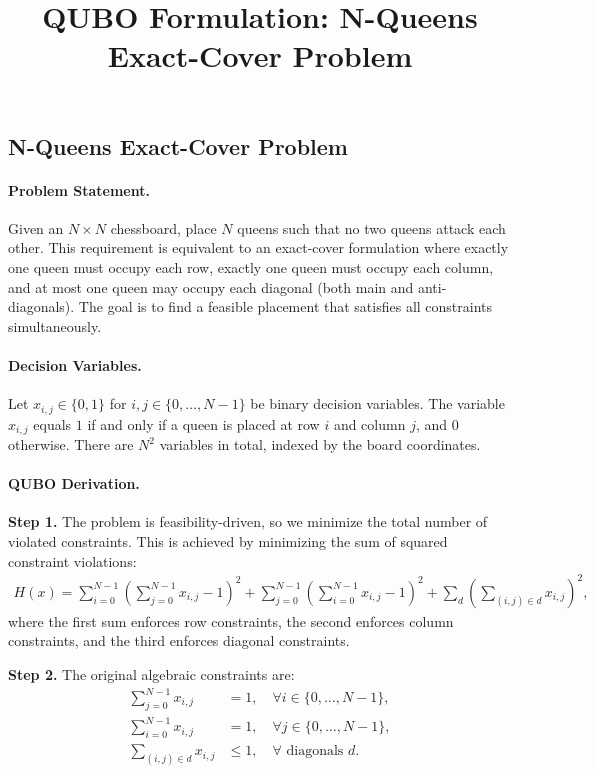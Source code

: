 \documentclass[12pt]{article}
\title{QUBO Formulation: N-Queens Exact-Cover Problem}
\date{}
\begin{document}
\maketitle

\subsection*{N-Queens Exact-Cover Problem}

\paragraph{Problem Statement.}
Given an $N \times N$ chessboard, place $N$ queens such that no two queens attack each other. This requirement is equivalent to an exact-cover formulation where exactly one queen must occupy each row, exactly one queen must occupy each column, and at most one queen may occupy each diagonal (both main and anti-diagonals). The goal is to find a feasible placement that satisfies all constraints simultaneously.

\paragraph{Decision Variables.}
Let $x_{i,j} \in \{0,1\}$ for $i,j \in \{0,\dots,N-1\}$ be binary decision variables. The variable $x_{i,j}$ equals $1$ if and only if a queen is placed at row $i$ and column $j$, and $0$ otherwise. There are $N^2$ variables in total, indexed by the board coordinates.

\paragraph{QUBO Derivation.}
\textbf{Step 1.} The problem is feasibility-driven, so we minimize the total number of violated constraints. This is achieved by minimizing the sum of squared constraint violations:
\begin{align}
H(x) = \sum_{i=0}^{N-1} \left(\sum_{j=0}^{N-1} x_{i,j} - 1\right)^2 + \sum_{j=0}^{N-1} \left(\sum_{i=0}^{N-1} x_{i,j} - 1\right)^2 + \sum_{d} \left(\sum_{(i,j) \in d} x_{i,j}\right)^2,
\end{align}
where the first sum enforces row constraints, the second enforces column constraints, and the third enforces diagonal constraints.

\textbf{Step 2.} The original algebraic constraints are:
\begin{align}
\sum_{j=0}^{N-1} x_{i,j} &= 1, \quad \forall i \in \{0,\dots,N-1\}, \\
\sum_{i=0}^{N-1} x_{i,j} &= 1, \quad \forall j \in \{0,\dots,N-1\}, \\
\sum_{(i,j) \in d} x_{i,j} &\le 1, \quad \forall \text{ diagonals } d.
\end{align}
\end{document}
